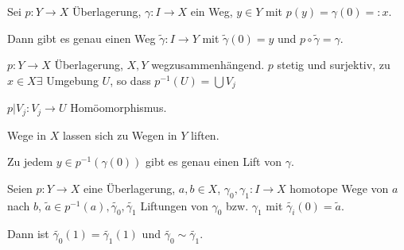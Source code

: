 \begin{satz}\label{thm:ueberlagerung-weg-satz-12.6}
    Sei $p: Y \rightarrow X$ Überlagerung, $\gamma: I \rightarrow X$
    ein Weg, $y \in Y$ mit $p(y) = \gamma(0) =: x$.

    Dann gibt es genau einen Weg $\tilde{\gamma}: I \rightarrow Y$
    mit $\tilde{\gamma}(0)=y$ und $p \circ \tilde{\gamma} = \gamma$.
\end{satz}

$p:Y \rightarrow X$ Überlagerung, $X,Y$ wegzusammenhängend.
$p$ stetig und surjektiv, zu $x \in X \exists$ Umgebung $U$, so dass
$p^{-1}(U) = \bigcup V_j$

$p|V_j: V_j \rightarrow U$ Homöomorphismus.

\begin{bemerkung}%
    Wege in $X$ lassen sich zu Wegen in $Y$ liften.

    Zu jedem $y \in p^{-1}(\gamma(0))$ gibt es genau einen Lift von 
    $\gamma$.
\end{bemerkung}

\begin{proposition}\label{proposition:12.7}%
    Seien $p: Y \rightarrow X$ eine Überlagerung, $a,b \in X$,
    $\gamma_0, \gamma_1: I \rightarrow X$ homotope Wege von $a$ nach
    $b$, $\tilde{a} \in p^{-1}(a), \tilde{\gamma_0}, \tilde{\gamma_1}$
    Liftungen von $\gamma_0$ bzw. $\gamma_1$ mit 
    $\tilde{\gamma_i}(0) = \tilde{a}$.

    Dann ist $\tilde{\gamma_0}(1) = \tilde{\gamma_1}(1)$ und
    $\tilde{\gamma_0} \sim \tilde{\gamma_1}$.
\end{proposition}


